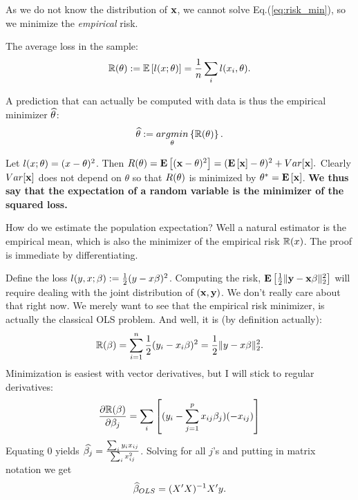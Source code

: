 As we do not know the distribution of $\mathbf{x}$, we cannot solve Eq.(\ref{eq:risk_min}), so we minimize the \emph{empirical} risk.
\begin{definition}
The average loss in the sample: 
\begin{align}
	\mathbb{R}(\theta):=\mathbb{E}\left[l(x;\theta)\right]=\frac{1}{n}\sum_i l(x_i,\theta).
\end{align}
\end{definition}

A prediction that can actually be computed with data is thus the empirical minimizer $\widehat{\theta}$:
\begin{align}
\label{eq:empirical_risk_min}
 \widehat{\theta}:= \mathop{argmin} _{\theta}\left\{ \mathbb{R}(\theta) \right\}.
\end{align}



\begin{example}
\label{eg:squared_loss}

Let $l(x;\theta)=(x-\theta)^2$. Then 
$
	R(\theta) = 
	\mathbf{E}\left[ (\mathbf{x}-\theta)^2 \right] = 
	(\mathbf{E}\left[ \mathbf{x} \right]-\theta)^2 + Var[\mathbf{x}]. 
$
Clearly  $Var[\mathbf{x}]$ does not depend on $\theta$  so that $R(\theta)$ is minimized by $\theta^*=\mathbf{E}\left[ \mathbf{x} \right]$.
\textbf{We thus say that the expectation of a random variable is the minimizer of the squared loss.}

How do we estimate the population expectation? Well a natural estimator is the empirical mean, which is also the minimizer of the empirical risk $\mathbb{R}(x)$. The proof is immediate by differentiating. 
\end{example}


\begin{example}
\label{eg:OLS}
Define the loss $l(y,x;\beta):=\frac{1}{2}(y-x\beta)^2$.
Computing the risk, $\mathbf{E}\left[ \frac{1}{2} \Vert \mathbf{y}-\mathbf{x}\beta \Vert_2^2 \right]$ will require dealing with the joint distribution of $(\mathbf{x},\mathbf{y})$.
We don't really care about that right now. 
We merely want to see that the empirical risk minimizer, is actually the classical OLS problem. 
And well, it is (by definition actually):
\begin{align*}
	\mathbb{R}(\beta)=\sum_{i=1}^n 	\frac{1}{2}(y_i-x_i\beta)^2 = \frac{1}{2}\Vert y-x\beta \Vert_2^2.
\end{align*}
Minimization is easiest with vector derivatives, but I will stick to regular derivatives:
\begin{align*}
	\frac{\partial \mathbb{R}(\beta)}{\partial {\beta_j}} = \sum_i \left[ (y_i-\sum_{j=1}^p x_{ij}\beta_j)(-x_{ij}) \right]
\end{align*}
Equating $0$ yields $\widehat{\beta_j}=\frac{\sum_i y_i x_{ij}}{\sum_i x_{ij}^2}$.
Solving for all $j$'s and putting in matrix notation we get
\begin{align}
	\widehat{\beta}_{OLS}=(X'X)^{-1} X'y.
\end{align}

\end{example}


